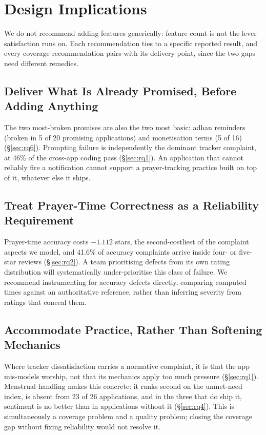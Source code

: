 
\section{Design Implications}
\label{sec:design-implications}

We do not recommend adding features generically: feature count is not the
lever satisfaction runs on. Each recommendation ties to a specific reported
result, and every coverage recommendation pairs with its delivery point, since
the two gaps need different remedies.

\subsection{Deliver What Is Already Promised, Before Adding Anything}

The two most-broken promises are also the two most basic: adhan reminders
(broken in 5 of 20 promising applications) and monetisation terms (5 of 16)
(\S\ref{sec:rq6}). Prompting failure is independently the dominant tracker
complaint, at 46\% of the cross-app coding pass (\S\ref{sec:rq1}). An
application that cannot reliably fire a notification cannot support a
prayer-tracking practice built on top of it, whatever else it ships.

\subsection{Treat Prayer-Time Correctness as a Reliability Requirement}

Prayer-time accuracy costs \(-1.112\) stars, the second-costliest of the
complaint aspects we model, and 41.6\% of accuracy complaints arrive inside
four- or five-star reviews (\S\ref{sec:rq2}). A team prioritising defects from
its own rating distribution will systematically under-prioritise this class of
failure. We recommend instrumenting for accuracy defects directly, comparing
computed times against an authoritative reference, rather than inferring
severity from ratings that conceal them.

\subsection{Accommodate Practice, Rather Than Softening Mechanics}
\label{sec:design-accommodate}

Where tracker dissatisfaction carries a normative complaint, it is that the
app mis-models worship, not that its mechanics apply too much pressure
(\S\ref{sec:rq1}). Menstrual handling makes this concrete: it ranks second on
the unmet-need index, is absent from 23 of 26 applications, and in the three
that do ship it, sentiment is no better than in applications without it
(\S\ref{sec:rq4}). This is simultaneously a coverage problem and a quality
problem; closing the coverage gap without fixing reliability would not resolve
it.

